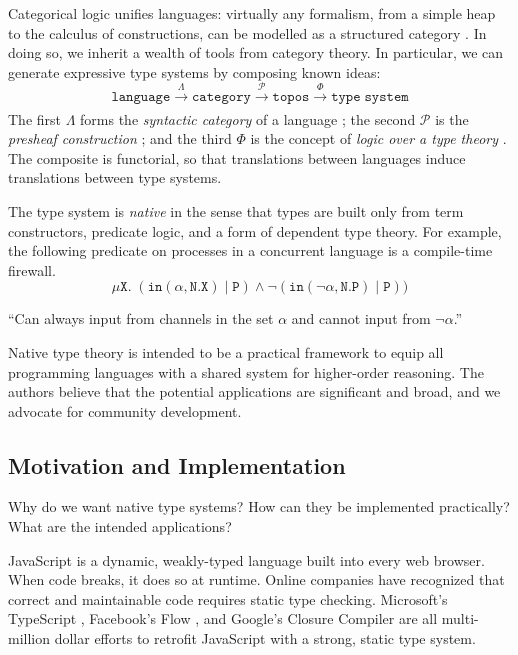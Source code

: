 \documentclass[12pt]{article}
\newcommand{\cnt}[1]{\begin{center}#1\end{center}}
\theoremstyle{definition}
\newcommand{\msc}[1]{\mathscr{#1}}
\newcommand{\mtt}[1]{\mathtt{#1}}
\newcommand{\xr}[2]{\xrightarrow[#2]{#1}}
\newcommand{\pow}{\msc{P}}
\newcommand{\N}{\mtt{N}}
\newcommand{\PP}{\mtt{P}}
\newcommand{\tti}{\mtt{in}}
\begin{document}
Categorical logic unifies languages: virtually any formalism, from a simple heap to the calculus of constructions, can be modelled as a structured category \cite{jacobs}. In doing so, we inherit a wealth of tools from category theory. In particular, we can generate expressive type systems by composing known ideas:
\[\mtt{language} \xr{\Lambda}{}  \mtt{category} \xr{\pow}{} \mtt{topos} \xr{\Phi}{} \mtt{type \; system}\]
The first $\Lambda$ forms the \textit{syntactic category} of a language \cite{lawvere}; the second $\pow$ is the \textit{presheaf construction} \cite{leinster}; and the third $\Phi$ is the concept of \textit{logic over a type theory} \cite{jacobs}. The composite is functorial, so that translations between languages induce translations between type systems.


The type system is \textit{native} in the sense that types are built only from term constructors, predicate logic, and a form of dependent type theory. For example, the following predicate on processes in a concurrent language is a compile-time firewall.
\[\mu\mtt{X}.\; (\tti(\alpha,\N.\mtt{X})\;\vert\; \PP) \land \neg(\tti(\neg\alpha,\N.\PP)\;\vert\; \PP))\]
\cnt{\footnotesize{``Can always input from channels in the set $\alpha$ and cannot input from $\neg\alpha$.''}}

Native type theory is intended to be a practical framework to equip all programming languages with a shared system for higher-order reasoning. The authors believe that the potential applications are significant and broad, and we advocate for community development.

\subsection{Motivation and Implementation}
\label{ssec:motivation}

Why do we want native type systems? How can they be implemented practically? What are the intended applications?


JavaScript is a dynamic, weakly-typed language built into every web browser. When code breaks, it does so at runtime.  Online companies have recognized that correct and maintainable code requires static type checking. Microsoft's TypeScript \cite{microsoft}, Facebook's Flow \cite{facebook}, and Google's Closure Compiler \cite{google} are all multi-million dollar efforts to retrofit JavaScript with a strong, static type system.
\end{document}
